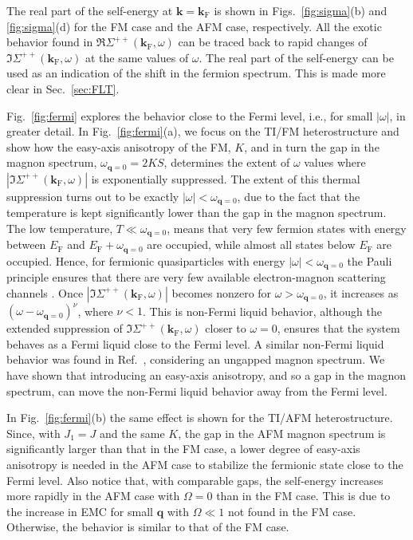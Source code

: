 \documentclass[aps, prb, twocolumn,amsmath,amssymb,floatfix]{revtex4-2}
\begin{document}
The real part of the self-energy at $\boldsymbol{k} = \boldsymbol{k}_{\textrm{F}}$ is shown in Figs.~\ref{fig:sigma}(b) and \ref{fig:sigma}(d) for the FM case and the AFM case, respectively. All the exotic behavior found in $\Re\Sigma^{++}(\boldsymbol{k}_{\textrm{F}}, \omega)$ can be traced back to rapid changes of $\Im\Sigma^{++}(\boldsymbol{k}_{\textrm{F}}, \omega)$ at the same values of $\omega$. The real part of the self-energy can be used as an indication of the shift in the fermion spectrum. This is made more clear in Sec.~\ref{sec:FLT}. 






Fig.~\ref{fig:fermi} explores the behavior close to the Fermi level, i.e., for small $|\omega|$, in greater detail. In Fig.~\ref{fig:fermi}(a), we focus on the TI/FM heterostructure and show how the easy-axis anisotropy of the FM, $K$, and in turn the gap in the magnon spectrum, $\omega_{\boldsymbol{q}=0} = 2KS$, determines the extent of $\omega$ values where $|\Im\Sigma^{++}(\boldsymbol{k}_{\textrm{F}}, \omega)|$ is exponentially suppressed. 
The extent of this thermal suppression turns out to be exactly $|\omega| < \omega_{\boldsymbol{q}=0}$, due to the fact that the temperature is kept significantly lower than the gap in the magnon spectrum. The low temperature, $T \ll \omega_{\boldsymbol{q}=0}$, means that very few fermion states with energy between $E_\textrm{F}$ and $E_\textrm{F} + \omega_{\boldsymbol{q}=0}$ are occupied, while almost all states below $E_\textrm{F}$ are occupied. Hence, for fermionic quasiparticles with energy $|\omega| < \omega_{\boldsymbol{q}=0}$ the Pauli principle ensures that there are very few available electron-magnon scattering channels \cite{elphcselfenergyprlpark, elphcselfenergyprltse}.
Once $|\Im\Sigma^{++}(\boldsymbol{k}_{\textrm{F}}, \omega)|$ becomes nonzero for $\omega > \omega_{\boldsymbol{q}=0}$, it increases as $(\omega-\omega_{\boldsymbol{q}=0})^\nu$, where $\nu < 1$. This is non-Fermi liquid behavior, although the extended suppression of $\Im\Sigma^{++}(\boldsymbol{k}_{\textrm{F}}, \omega)$ closer to $\omega = 0$, ensures that the system behaves as a Fermi liquid close to the Fermi level. A similar non-Fermi liquid behavior was found in Ref.~\cite{kargarianprl}, considering an ungapped magnon spectrum. We have shown that introducing an easy-axis anisotropy, and so a gap in the magnon spectrum, can move the non-Fermi liquid behavior away from the Fermi level.


In Fig.~\ref{fig:fermi}(b) the same effect is shown for the TI/AFM heterostructure. 
Since, with $J_1 = J$ and the same $K$, the gap in the AFM magnon spectrum is significantly larger than that in the FM case, a lower degree of easy-axis anisotropy is needed in the AFM case to stabilize the fermionic state close to the Fermi level. 
Also notice that, with comparable gaps, the self-energy increases more rapidly in the AFM case with $\Omega = 0$ than in the FM case. This is due to the increase in EMC for small $\boldsymbol{q}$ with $\Omega \ll 1$ not found in the FM case. Otherwise, the behavior is similar to that of the FM case. 
\end{document}
